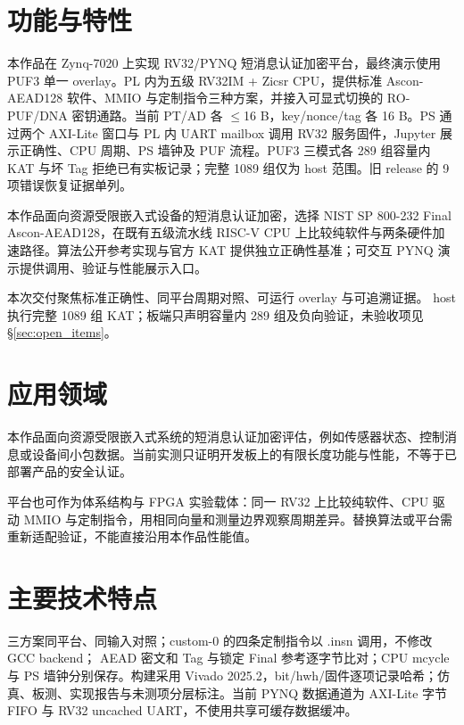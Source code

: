 
\Needspace{85pt}

\section{功能与特性}

本作品在 Zynq-7020 上实现 RV32/PYNQ 短消息认证加密平台，最终演示使用 PUF3 单一 overlay。PL 内为五级 RV32IM + Zicsr CPU，提供标准 Ascon-AEAD128 软件、MMIO 与定制指令三种方案，并接入可显式切换的 RO-PUF/DNA 密钥通路。当前 PT/AD 各 $\leq$16 B，key/nonce/tag 各 16 B。PS 通过两个 AXI-Lite 窗口与 PL 内 UART mailbox 调用 RV32 服务固件，Jupyter 展示正确性、CPU 周期、PS 墙钟及 PUF 流程。PUF3 三模式各 289 组容量内 KAT 与坏 Tag 拒绝已有实板记录；完整 1089 组仅为 host 范围。旧 release 的 9 项错误恢复证据单列。

本作品面向资源受限嵌入式设备的短消息认证加密，选择 NIST SP 800-232 Final Ascon-AEAD128，在既有五级流水线 RISC-V CPU 上比较纯软件与两条硬件加速路径。算法公开参考实现与官方 KAT 提供独立正确性基准；可交互 PYNQ 演示提供调用、验证与性能展示入口。

本次交付聚焦标准正确性、同平台周期对照、可运行 overlay 与可追溯证据。 host 执行完整 1089 组 KAT；板端只声明容量内 289 组及负向验证，未验收项见 §\ref{sec:open_items}。

\Needspace{85pt}

\section{应用领域}

本作品面向资源受限嵌入式系统的短消息认证加密评估，例如传感器状态、控制消息或设备间小包数据。当前实测只证明开发板上的有限长度功能与性能，不等于已部署产品的安全认证。

平台也可作为体系结构与 FPGA 实验载体：同一 RV32 上比较纯软件、CPU 驱动 MMIO 与定制指令，用相同向量和测量边界观察周期差异。替换算法或平台需重新适配验证，不能直接沿用本作品性能值。

\Needspace{85pt}

\section{主要技术特点}

三方案同平台、同输入对照；custom-0 的四条定制指令以 .insn 调用，不修改 GCC backend； AEAD 密文和 Tag 与锁定 Final 参考逐字节比对；CPU mcycle 与 PS 墙钟分别保存。构建采用 Vivado 2025.2，bit/hwh/固件逐项记录哈希；仿真、板测、实现报告与未测项分层标注。当前 PYNQ 数据通道为 AXI-Lite 字节 FIFO 与 RV32 uncached UART，不使用共享可缓存数据缓冲。

